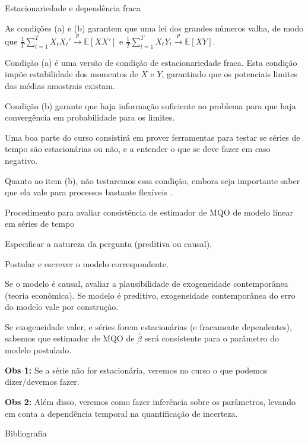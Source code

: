 \documentclass[11pt]{beamer}
\newenvironment{halfwideitemize}{\itemize\addtolength{\itemsep}{0.5em}}{\enditemize}
\newenvironment{halfwideenumerate}{\enumerate\addtolength{\itemsep}{0.5em}}{\endenumerate}
\begin{document}
	\begin{frame}{Estacionariedade e dependência fraca}
		\begin{halfwideitemize}
			\item As condições (a) e (b) garantem que uma lei dos grandes números valha, de modo que $\frac{1}{T}\sum_{t=1}^T X_t X_t' \overset{p}{\to} \mathbb{E}[XX']$ e $\frac{1}{T}\sum_{t=1}^T X_t Y_t \overset{p}{\to} \mathbb{E}[X Y]$.
			\begin{halfwideitemize}
				\item Condição (a) é uma versão de condição de {\color{blue}estacionariedade fraca}. Esta condição impõe estabilidade dos momentos de $X$ e $Y$, garantindo que os potenciais limites das médias amostrais existam.
				\item Condição (b) garante que haja informação suficiente no problema para que haja convergência em probabilidade para os limites.
			\end{halfwideitemize}
			\item Uma boa parte do curso consistirá em prover ferramentas para testar se séries de tempo são estacionárias ou não, e a entender o que se deve fazer em caso negativo. 
			\item Quanto ao item (b), não testaremos essa condição, embora seja importante saber que ela vale para processos bastante flexíveis \citep{Carrasco2002}.
		\end{halfwideitemize}
	\end{frame}
	
	\begin{frame}{Procedimento para avaliar consistência de estimador de MQO de modelo linear em séries de tempo}
		\begin{halfwideenumerate}
			\item Especificar a natureza da pergunta (preditiva ou causal). 
			\item Postular e escrever o modelo correspondente.
			\item Se o modelo é causal, avaliar a plausibilidade de exogeneidade contemporânea (teoria econômica). Se modelo é preditivo, exogeneidade contemporânea do erro do modelo vale por construção.
			\item Se exogeneidade valer, e séries forem estacionárias (e fracamente dependentes), sabemos que estimador de MQO de $\hat{\beta}$ será consistente para o parâmetro do modelo postulado.

		\end{halfwideenumerate}
		\vspace{1em}
			\textbf{Obs 1:} Se a série não for estacionária, veremos no curso o que podemos dizer/devemos fazer.
			
			\vspace{1em}
			\textbf{Obs 2:} Além disso, veremos como fazer inferência sobre os parâmetros, levando em conta a dependência temporal na quantificação de incerteza.
		\end{frame}
	\begin{frame}[allowframebreaks]{Bibliografia}
	\printbibliography

	\end{frame}
\end{document}
